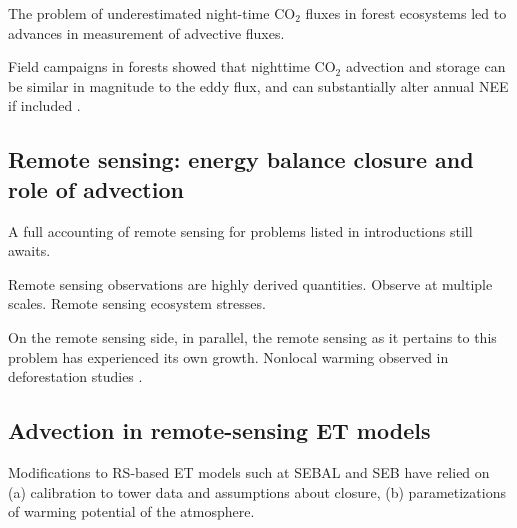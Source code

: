 \documentclass{article}
\begin{document}
    \citet{harder_simple_2019}
    
    
    
    The problem of underestimated night-time CO$_2$ fluxes in forest ecosystems led to advances in measurement of advective fluxes.
    
     Field campaigns in forests showed that nighttime CO$_2$ advection and storage can be similar in magnitude to the eddy flux, and can substantially alter annual NEE if included \cite{aubinet2003horizontal, marcolla2005importance, yi2008contribution, feigenwinter2008comparison, etzold2010contribution}. 
    
    
    \subsection{Remote sensing: energy balance closure and role of advection}
    
    A full accounting of remote sensing for problems listed in introductions still awaits.
    
    Remote sensing observations are highly derived quantities. Observe at multiple scales. Remote sensing ecosystem stresses. 
    
    On the remote sensing side, in parallel, the remote sensing as it pertains to this problem has experienced its own growth. 
    Nonlocal warming observed in deforestation studies \cite{cohn_forest_2019}.
    
    \subsection{Advection in remote-sensing ET models}
    
    Modifications to RS-based ET models such at SEBAL and SEB have relied on 
    (a) calibration to tower data and assumptions about closure, 
    (b) parametizations of warming potential of the atmosphere.
    
\end{document}
